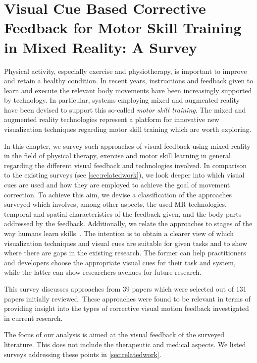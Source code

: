 
\chapter{Visual Cue Based Corrective Feedback for Motor Skill Training in Mixed Reality: A Survey\label{chap:visualCueSurvey}}

Physical activity, especially exercise and physiotherapy, is important to improve and retain a healthy condition. In recent years, instructions and feedback given to learn and execute the relevant body movements have been increasingly supported by technology. In particular, systems employing mixed and augmented reality have been devised to support this so-called \emph{motor skill training}. The mixed and augmented reality technologies represent a platform for innovative new visualization techniques regarding motor skill training which are worth exploring.

In this chapter, we survey such approaches of visual feedback using mixed reality in the field of physical therapy, exercise and motor skill learning in general regarding the different visual feedback and technologies involved. In comparison to the existing surveys (see \autoref{sec:relatedwork}), we look deeper into which visual cues are used and how they are employed to achieve the goal of movement correction. To achieve this aim, we devise a classification of the approaches surveyed which involves, among other aspects, the used MR technologies, temporal and spatial characteristics of the feedback given, and the body parts addressed by the feedback. Additionally, we relate the approaches to stages of the way humans learn skills~\cite{fitts1967HPe}. The intention is to obtain a clearer view of which visualization techniques and visual cues are suitable for given tasks and to show where there are gaps in the existing research. The former can help practitioners and developers choose the appropriate visual cues for their task and system, while the latter can show researchers avenues for future research. 

This survey discusses approaches from 39 papers which were selected
out of 131 papers initially reviewed. These approaches were found to be relevant in terms of providing insight into the types of corrective visual motion feedback investigated in current research.

The focus of our analysis is aimed at the visual feedback of the surveyed literature. This does not include the therapeutic and medical aspects. We listed surveys addressing these points in \autoref{sec:relatedwork}.

